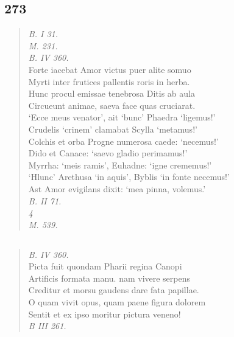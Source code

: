 \documentclass[11pt, a4paper]{report}
\begin{document}
            \subsection*{273}
      \begin{verse}
      \textit{B. I 31.} \\ \textit{M. 231.} \\ \textit{B. IV 360.} \\ Forte iacebat Amor victus puer alite somuo \\ Myrti inter frutices pallentis roris in herba. \\ Hunc procul emissae tenebrosa Ditis ab aula \\ Circueunt animae, saeva face quas cruciarat. \\ ‘Ecce meus venator’, ait ‘bunc’ Phaedra ‘ligemus!’ \\ Crudelis ‘crinem’ clamabat Scylla ‘metamus!’ \\ Colchis et orba Progne numerosa caede: ‘necemus!’ \\ Dido et Canace: ‘saevo gladio perimamus!’ \\ Myrrha: ‘meis ramis’, Euhadne: ‘igne crememus!’ \\ ‘Hlunc’ Arethusa ‘in aquis’, Byblis ‘in fonte necemus!’ \\ Ast Amor evigilans dixit: ‘mea pinna, volemus.’ \\ \textit{B. II 71.} \\ \textit{4} \\ \textit{M. 539.} \\ 
      \end{verse}
  
            \subsection*{}
      \begin{verse}
      \textit{B. IV 360.} \\ Picta fuit quondam Pharii regina Canopi \\ Artificis formata manu. nam vivere serpens \\ Creditur et morsu gaudens dare fata papillae. \\ O quam vivit opus, quam paene figura dolorem \\ Sentit et ex ipso moritur pictura veneno! \\ \textit{B III 261.} \\ 
      \end{verse}
  
\end{document}

